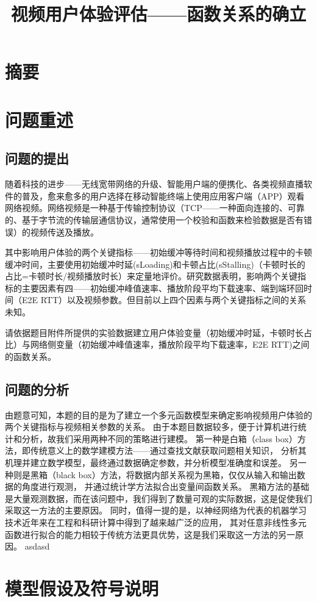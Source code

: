 \documentclass[UTF8]{ctexart}
\title{视频用户体验评估——函数关系的确立}
\begin{document}
\maketitle
\section{摘要}
\section{问题重述}
\subsection{问题的提出}
随着科技的进步——无线宽带网络的升级、智能用户端的便携化、各类视频直播软件的普及，愈来愈多的用户选择在移动智能终端上使用应用客户端（APP）观看网络视频。网络视频是一种基于传输控制协议（TCP——一种面向连接的、可靠的、基于字节流的传输层通信协议，通常使用一个校验和函数来检验数据是否有错误）的视频传送及播放。

其中影响用户体验的两个关键指标——初始缓冲等待时间和视频播放过程中的卡顿缓冲时间，主要使用初始缓冲时延(sLoading)和卡顿占比(sStalling)（卡顿时长的占比=卡顿时长/视频播放时长）来定量地评价。研究数据表明，影响两个关键指标的主要因素有四——初始缓冲峰值速率、播放阶段平均下载速率、端到端环回时间（E2E RTT）以及视频参数。但目前以上四个因素与两个关键指标之间的关系未知。

请依据题目附件所提供的实验数据建立用户体验变量（初始缓冲时延，卡顿时长占比）与网络侧变量（初始缓冲峰值速率，播放阶段平均下载速率，E2E RTT)之间的函数关系。
\subsection{问题的分析}
由题意可知，本题的目的是为了建立一个多元函数模型来确定影响视频用户体验的两个关键指标与视频相关参数的关系。
由于本题目数据较多，便于计算机进行统计和分析，故我们采用两种不同的策略进行建模。
第一种是白箱（class box）方法，即传统意义上的数学建模方法——通过查找文献获取问题相关知识，
分析其机理并建立数学模型，最终通过数据确定参数，并分析模型准确度和误差。
另一种则是黑箱（black box）方法，将数据内部关系视为黑箱，仅仅从输入和输出数据的角度进行观测，
并通过统计学方法拟合出变量间函数关系。
黑箱方法的基础是大量观测数据，而在该问题中，我们得到了数量可观的实际数据，这是促使我们采取这一方法的主要原因。
同时，值得一提的是，以神经网络为代表的机器学习技术近年来在工程和科研计算中得到了越来越广泛的应用，
其对任意非线性多元函数进行拟合的能力相较于传统方法更具优势，这是我们采取这一方法的另一原因。
asdasd
\section{模型假设及符号说明}
\end{document}
